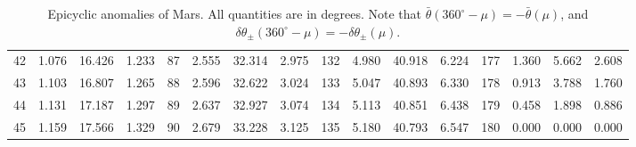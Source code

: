 \begin{table}[!h]
{\begin{tabular}{rrrr|rrrr|rrrr|rrrr}
 42 & \tiny{  1.076} &  16.426 & \tiny{  1.233} &  87 & \tiny{  2.555} &  32.314 & \tiny{  2.975} & 132 & \tiny{  4.980} &  40.918 & \tiny{  6.224} & 177 & \tiny{  1.360} &   5.662 & \tiny{  2.608}\\
 43 & \tiny{  1.103} &  16.807 & \tiny{  1.265} &  88 & \tiny{  2.596} &  32.622 & \tiny{  3.024} & 133 & \tiny{  5.047} &  40.893 & \tiny{  6.330} & 178 & \tiny{  0.913} &   3.788 & \tiny{  1.760}\\
 44 & \tiny{  1.131} &  17.187 & \tiny{  1.297} &  89 & \tiny{  2.637} &  32.927 & \tiny{  3.074} & 134 & \tiny{  5.113} &  40.851 & \tiny{  6.438} & 179 & \tiny{  0.458} &   1.898 & \tiny{  0.886}\\
 45 & \tiny{  1.159} &  17.566 & \tiny{  1.329} &  90 & \tiny{  2.679} &  33.228 & \tiny{  3.125} & 135 & \tiny{  5.180} &  40.793 & \tiny{  6.547} & 180 & \tiny{  0.000} &   0.000 & \tiny{  0.000}\\ 
\end{tabular}}
\caption{Epicyclic anomalies of Mars. All quantities are in degrees. Note that $\bar{\theta}(360^\circ-\mu) = -\bar{\theta}(\mu)$, and $\delta\theta_{\pm}(360^\circ-\mu) = -\delta\theta_{\pm}(\mu)$. }\label{vt10}
\end{table}

